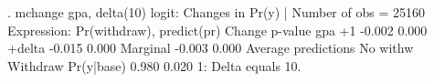 . mchange gpa, delta(10)
{\smallskip}
logit: Changes in Pr(y) | Number of obs = 25160
{\smallskip}
Expression: Pr(withdraw), predict(pr)
{\smallskip}
             {\VBAR}    Change    p-value 
gpa          {\VBAR}                      
          +1 {\VBAR}    -0.002      0.000 
      +delta {\VBAR}    -0.015      0.000 
    Marginal {\VBAR}    -0.003      0.000 
{\smallskip}
Average predictions
{\smallskip}
             {\VBAR} No with{\tytilde}w   Withdraw 
  Pr(y|base) {\VBAR}     0.980      0.020 
{\smallskip}
1: Delta equals 10.
{\smallskip}
